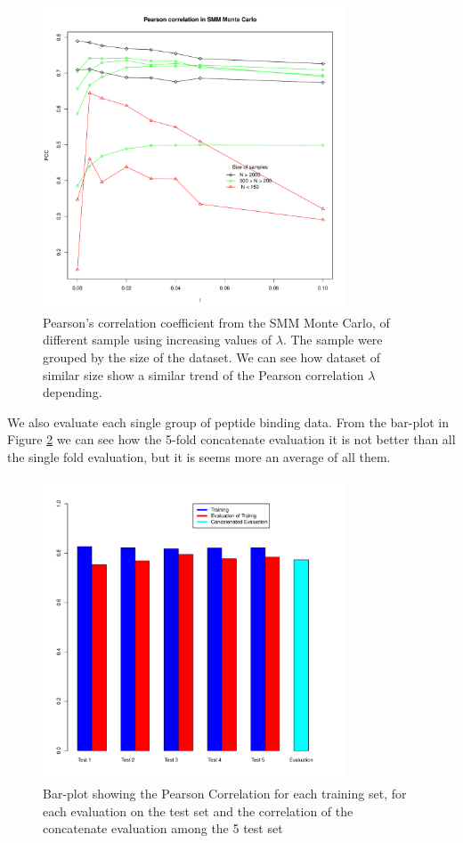 \documentclass{bioinfo}
\begin{document}
\begin{application}
\begin{figure}[!tpb]
\centerline{\includegraphics[width=9cm]{fig/smm_mc_l005_ppc_size.pdf}}
\caption{Pearson's correlation coefficient from the SMM Monte Carlo, of different sample using increasing values of $\lambda$. The sample were grouped by the size of the dataset. We can see how dataset of similar size show a similar trend of the Pearson correlation $\lambda$ depending.}
\label{fig:02}
\end{figure}
\par We also evaluate each single group of peptide binding data. From the bar-plot in Figure \ref{fig:05} we can see how the 5-fold concatenate evaluation it is not better than all the single fold evaluation, but it is seems more an average of all them.

\begin{figure}[!tpb]
\centerline{\includegraphics[width=9cm]{fig/barplot.pdf}}
\caption{Bar-plot showing the Pearson Correlation for each training set, for each evaluation on the test set and the correlation of the concatenate evaluation among the 5 test set}
\label{fig:05}
\end{figure}




\end{application}
\end{document}
